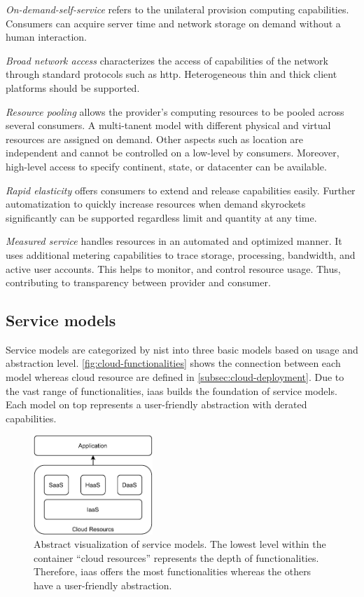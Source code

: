 \textit{On-demand-self-service} refers to the unilateral provision computing capabilities.
Consumers can acquire server time and network storage on demand without a human interaction.

\textit{Broad network access} characterizes the access of capabilities of the network through standard protocols such as \ac{http}.
Heterogeneous thin and thick client platforms should be supported.

\textit{Resource pooling} allows the provider's computing resources to be pooled across several consumers.
A multi-tanent model with different physical and virtual resources are assigned on demand.
Other aspects such as location are independent and cannot be controlled on a low-level by consumers.
Moreover, high-level access to specify continent, state, or datacenter can be available.

\textit{Rapid elasticity} offers consumers to extend and release capabilities easily.
Further automatization to quickly increase resources  when demand skyrockets significantly can be supported regardless limit and quantity at any time.

\textit{Measured service} handles resources in an automated and optimized manner.
It uses additional metering capabilities to trace storage, processing, bandwidth, and active user accounts.
This helps to monitor, and control resource usage. Thus, contributing to transparency between provider and consumer.

\subsection{Service models}
\label{subsec:cloud-service}

Service models are categorized by \ac{nist} into three basic models based on usage and abstraction level.
\autoref{fig:cloud-functionalities} shows the connection between each model whereas cloud resource are defined in \autoref{subsec:cloud-deployment}.
Due to the vast range of functionalities, \ac*{iaas} builds the foundation of service models.
Each model on top represents a user-friendly abstraction with derated capabilities.

\begin{figure}[ht]
    \centering
    \includegraphics[width=0.4\textwidth]{figures/cloud-service-models.pdf}
    \caption[Abstract visualization of service models]{Abstract visualization of service models. The lowest level within the container \enquote{cloud resources} represents the depth of functionalities. Therefore, \ac{iaas} offers the most functionalities whereas the others have a user-friendly abstraction.}
    \label{fig:cloud-functionalities}
\end{figure}

